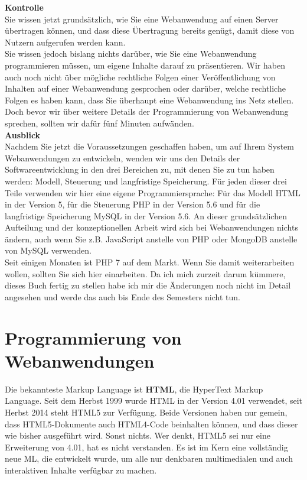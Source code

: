 \textbf{Kontrolle}\\

Sie wissen jetzt grundsätzlich, wie Sie eine Webanwendung auf einen Server übertragen können, und dass diese Übertragung bereits genügt, damit diese von Nutzern aufgerufen werden kann.\\

Sie wissen jedoch bislang nichts darüber, wie Sie eine Webanwendung programmieren müssen, um eigene Inhalte darauf zu präsentieren. Wir haben auch noch nicht über mögliche rechtliche Folgen einer Veröffentlichung von Inhalten auf einer Webanwendung gesprochen oder darüber, welche rechtliche Folgen es haben kann, dass Sie überhaupt eine Webanwendung ins Netz stellen. Doch bevor wir über weitere Details der Programmierung von Webanwendung sprechen, sollten wir dafür fünf Minuten aufwänden.\\

\textbf{Ausblick}\\

Nachdem Sie jetzt die Voraussetzungen geschaffen haben, um auf Ihrem System Webanwendungen zu entwickeln, wenden wir uns den Details der Softwareentwicklung in den drei Bereichen zu, mit denen Sie zu tun haben werden: Modell, Steuerung und langfristige Speicherung. Für jeden dieser drei Teile verwenden wir hier eine eigene Programmiersprache: Für das Modell HTML in der Version 5, für die Steuerung PHP in der Version 5.6 und für die langfristige Speicherung MySQL in der Version 5.6. An dieser grundsätzlichen Aufteilung und der konzeptionellen Arbeit wird sich bei Webanwendungen nichts ändern, auch wenn Sie z.B. JavaScript anstelle von PHP oder MongoDB anstelle von MySQL verwenden.\\

Seit einigen Monaten ist PHP 7 auf dem Markt. Wenn Sie damit weiterarbeiten wollen, sollten Sie sich hier einarbeiten. Da ich mich zurzeit darum kümmere, dieses Buch fertig zu stellen habe ich mir die Änderungen noch nicht im Detail angesehen und werde das auch bis Ende des Semesters nicht tun.

\section{Programmierung von Webanwendungen}

Die bekannteste Markup Language ist \textbf{HTML}, die HyperText Markup Language. Seit dem Herbst 1999 wurde HTML in der Version 4.01 verwendet, seit Herbst 2014 steht HTML5 zur Verfügung. Beide Versionen haben nur gemein, dass HTML5-Dokumente auch HTML4-Code beinhalten können, und dass dieser wie bisher ausgeführt wird. Sonst nichts. Wer denkt, HTML5 sei nur eine Erweiterung von 4.01, hat es nicht verstanden. Es ist im Kern eine vollständig neue ML, die entwickelt wurde, um alle nur denkbaren multimedialen und auch interaktiven Inhalte verfügbar zu machen.\\

